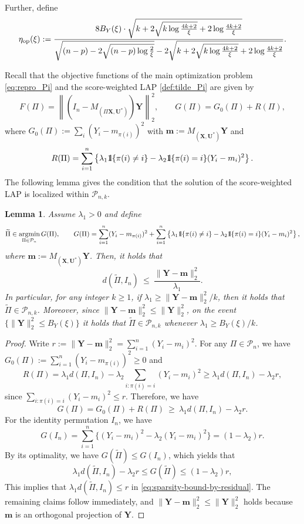 \documentclass[11pt, reqno]{amsart}
\renewcommand{\tilde}{\widetilde}
\renewcommand{\le}{\leqslant}
\renewcommand{\ge}{\geqslant}
\newcommand{\mP}{\mathcal{P}}
\newcommand{\1}{\mbox{1}\hspace{-0.25em}\mbox{l}}
\DeclareMathOperator*{\argmin}{argmin}
\theoremstyle{definition}\newtheorem{problem}{Problem}[section]
\theoremstyle{definition}\newtheorem{definition}[problem]{Definition}
\theoremstyle{remark}\newtheorem{assumption}{Assumption}
\theoremstyle{remark}\newtheorem{remark}[problem]{Remark}
\theoremstyle{definition}\newtheorem{example}[problem]{Example}
\theoremstyle{plain}\newtheorem{theorem}[problem]{Theorem}
\theoremstyle{plain}\newtheorem{question}[problem]{Question}
\theoremstyle{plain}\newtheorem{lemma}[problem]{Lemma}
\theoremstyle{plain}\newtheorem{proposition}[problem]{Proposition}
\theoremstyle{plain}\newtheorem{corollary}[problem]{Corollary}
\theoremstyle{plain}\newtheorem{conjecture}[problem]{Conjecture}
\begin{document}
Further, define 
\begin{equation}\label{eq:eta-op-def}
\eta_{\rm op}(\xi) :=   
\frac{8 B_Y(\xi)\cdot\sqrt{k+2\sqrt{k\log \frac{4k+2}{\xi}}+2\log \frac{4k+2}{\xi}}}
{\sqrt{(n-p)-2\sqrt{(n-p)\log \frac{2}{\xi}}}-2\sqrt{k+2\sqrt{k\log \frac{4k+2}{\xi}}+2\log \frac{4k+2}{\xi}}}.
\end{equation}

Recall that the objective functions of the main optimization problem \eqref{eq:repro_Pi} and the score-weighted LAP \eqref{def:tilde_Pi} are given by
\[
F(\Pi)=\left\|(I_n-M_{(\Pi\bm X,\bm U^*)}) \bm Y\right\|_2^2,
\qquad
G(\Pi)=G_0(\Pi)+R(\Pi),
\]
where $G_0(\Pi):=\sum_i(Y_i-m_{\pi(i)})^2$ with $\bm m:=M_{(\bm X,\bm U^*)}\bm Y$ and
\[
R(\Pi)=\sum_{i=1}^n  \left\{\lambda_1   \1\{\pi(i)\neq i\}-\lambda_2   \1\{\pi(i)=i\} (Y_i-m_i)^2\right\}.
\]
The following lemma gives the condition that the solution of the score-weighted LAP is localized within $\mP_{n,k}$.

\begin{lemma}\label{lem:lap-minimizer-in-Pnk}
Assume $\lambda_1>0$ and define
\[
\tilde{\Pi}\in\argmin_{\Pi\in\mP_n} G(\Pi),
\qquad
G(\Pi)=\sum_{i=1}^n (Y_i-m_{\pi(i)})^2
+\sum_{i=1}^n\left\{\lambda_1\1\{\pi(i)\neq i\}-\lambda_2\1\{\pi(i)=i\}(Y_i-m_i)^2\right\},
\]
where $\bm m:=M_{(\bm X,\bm U^*)}\bm Y$.
Then, it holds that
\begin{equation}\label{eq:sparsity-bound-by-residual}
d(\tilde{\Pi},I_n)\ \le\ \frac{\|\bm Y-\bm m\|_2^2}{\lambda_1}.
\end{equation}
In particular, for any integer $k\ge 1$, if $\lambda_1\ge \|\bm Y-\bm m\|_2^2/k$, then it holds that $\tilde{\Pi}\in\mP_{n,k}$.
Moreover, since $\|\bm Y-\bm m\|_2^2\le \|\bm Y\|_2^2$, on the event $\{\|\bm Y\|_2^2\le B_Y(\xi)\}$ it holds that
$\tilde{\Pi}\in\mP_{n,k}$ whenever $\lambda_1\ge B_Y(\xi)/k$.
\end{lemma}

\begin{proof}
Write $r:=\|\bm Y-\bm m\|_2^2=\sum_{i=1}^n (Y_i-m_i)^2$.
For any $\Pi\in\mP_n$, we have $G_0(\Pi):=\sum_{i=1}^n (Y_i-m_{\pi(i)})^2\ge 0$ and
\[
R(\Pi)
=\lambda_1 d(\Pi,I_n)-\lambda_2\sum_{i:\pi(i)=i}(Y_i-m_i)^2
\ge \lambda_1 d(\Pi,I_n)-\lambda_2 r,
\]
since $\sum_{i:\pi(i)=i}(Y_i-m_i)^2\le r$. Therefore, we have
\[
G(\Pi)=G_0(\Pi)+R(\Pi)\ \ge\ \lambda_1 d(\Pi,I_n)-\lambda_2 r.
\]
For the identity permutation $I_n$, we have
\[
G(I_n)=\sum_{i=1}^n\{(Y_i-m_i)^2-\lambda_2(Y_i-m_i)^2\}=(1-\lambda_2)r.
\]
By its optimality, we have $G(\tilde{\Pi})\le G(I_n)$, which yields that
\[
\lambda_1 d(\tilde{\Pi},I_n)-\lambda_2 r
\le G(\tilde{\Pi})
\le (1-\lambda_2)r,
\]
This implies that $\lambda_1 d(\tilde{\Pi},I_n)\le r$ in \eqref{eq:sparsity-bound-by-residual}.
The remaining claims follow immediately, and $\|\bm Y-\bm m\|_2^2\le \|\bm Y\|_2^2$ holds because $\bm m$ is an orthogonal projection of $\bm Y$.
\end{proof}
\end{document}
